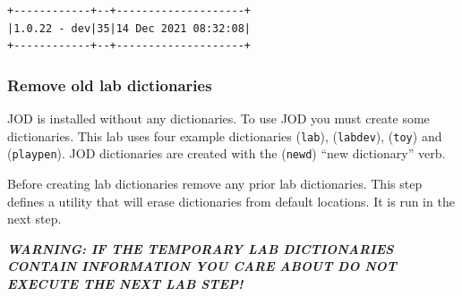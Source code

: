 \documentclass[11pt,letter,landscape]{article}
\begin{document}
    \begin{Verbatim}[commandchars=\\\{\}]
+------------+--+--------------------+
|1.0.22 - dev|35|14 Dec 2021 08:32:08|
+------------+--+--------------------+
    \end{Verbatim}

    \hypertarget{remove-old-lab-dictionaries}{%
\subsubsection{Remove old lab
dictionaries}\label{remove-old-lab-dictionaries}}

JOD is installed without any dictionaries. To use JOD you must create
some dictionaries. This lab uses four example dictionaries
(\texttt{lab}), (\texttt{labdev}), (\texttt{toy}) and
(\texttt{playpen}). JOD dictionaries are created with the
(\texttt{newd}) ``new dictionary'' verb.

Before creating lab dictionaries remove any prior lab dictionaries. This
step defines a utility that will erase dictionaries from default
locations. It is run in the next step.

\textbf{\emph{WARNING: IF THE TEMPORARY LAB DICTIONARIES CONTAIN
INFORMATION YOU CARE ABOUT DO NOT EXECUTE THE NEXT LAB STEP!}}
\end{document}
